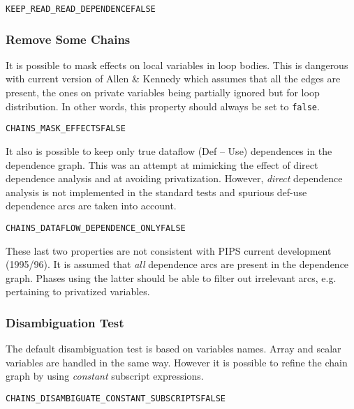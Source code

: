 \documentclass[a4paper]{report}
\newenvironment{PipsProp}{\begin{alltt}}{\end{alltt}}
\begin{document}
\begin{PipsProp}
KEEP_READ_READ_DEPENDENCE FALSE
\end{PipsProp}

\subsubsection{Remove Some Chains}

It is possible to mask effects on local variables in loop bodies. This
is dangerous with current version of Allen \& Kennedy which assumes that
all the edges are present, the ones on private variables being
partially ignored but for loop distribution. In other words, this
property should always be set to \verb+false+.

\begin{PipsProp}
CHAINS_MASK_EFFECTS FALSE
\end{PipsProp}

It also is possible to keep only true dataflow (Def -- Use) dependences in
the dependence graph. This was an attempt at mimicking the effect of
direct dependence analysis and at avoiding privatization. However, {\em
direct} dependence analysis is not implemented in the standard tests and
spurious def-use dependence arcs are taken into account.

\begin{PipsProp}
CHAINS_DATAFLOW_DEPENDENCE_ONLY FALSE
\end{PipsProp}

These last two properties are not consistent with PIPS current development
(1995/96). It is assumed that {\em all} dependence arcs are present in the
dependence graph. Phases using the latter should be able to filter out
irrelevant arcs, e.g. pertaining to privatized variables.

\subsubsection{Disambiguation Test}

The default disambiguation test is based on variables names. Array and
scalar variables are handled in the same way. However it is possible to
refine the chain graph by using {\em constant} subscript expressions.

\begin{PipsProp}
CHAINS_DISAMBIGUATE_CONSTANT_SUBSCRIPTS FALSE
\end{PipsProp}
\end{document}
